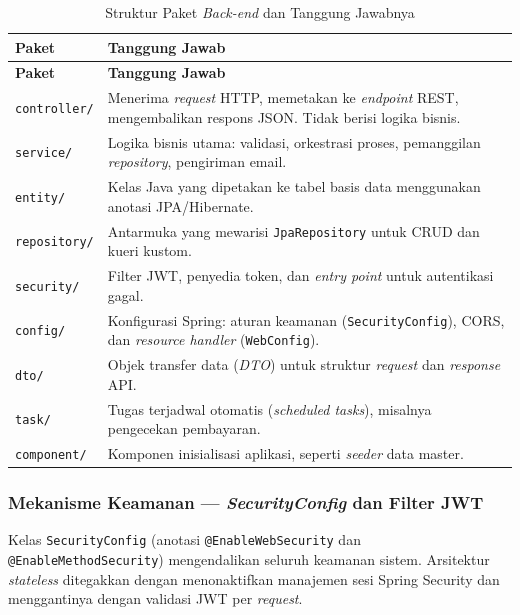 \begin{longtable}{|p{}|p{}|}
	\caption{Struktur Paket \textit{Back-end} dan Tanggung Jawabnya}
	\label{table:4.struktur_paket}\\
	\hline
	\textbf{Paket} & \textbf{Tanggung Jawab} \\
	\hline
	\endfirsthead
	\hline
	\textbf{Paket} & \textbf{Tanggung Jawab} \\
	\hline
	\endhead
	\texttt{controller/} & Menerima \textit{request} HTTP, memetakan ke \textit{endpoint} REST, mengembalikan respons JSON. Tidak berisi logika bisnis. \\
	\hline
	\texttt{service/} & Logika bisnis utama: validasi, orkestrasi proses, pemanggilan \textit{repository}, pengiriman email. \\
	\hline
	\texttt{entity/} & Kelas Java yang dipetakan ke tabel basis data menggunakan anotasi JPA/Hibernate. \\
	\hline
	\texttt{repository/} & Antarmuka yang mewarisi \texttt{JpaRepository} untuk CRUD dan kueri kustom. \\
	\hline
	\texttt{security/} & Filter JWT, penyedia token, dan \textit{entry point} untuk autentikasi gagal. \\
	\hline
	\texttt{config/} & Konfigurasi Spring: aturan keamanan (\texttt{SecurityConfig}), CORS, dan \textit{resource handler} (\texttt{WebConfig}). \\
	\hline
	\texttt{dto/} & Objek transfer data (\textit{DTO}) untuk struktur \textit{request} dan \textit{response} API. \\
	\hline
	\texttt{task/} & Tugas terjadwal otomatis (\textit{scheduled tasks}), misalnya pengecekan pembayaran. \\
	\hline
	\texttt{component/} & Komponen inisialisasi aplikasi, seperti \textit{seeder} data master. \\
	\hline
\end{longtable}

\subsubsection{Mekanisme Keamanan --- \textit{SecurityConfig} dan Filter JWT}

Kelas \texttt{SecurityConfig} (anotasi \texttt{@EnableWebSecurity} dan \texttt{@EnableMethodSecurity}) mengendalikan seluruh keamanan sistem. Arsitektur \textit{stateless} ditegakkan dengan menonaktifkan manajemen sesi Spring Security dan menggantinya dengan validasi JWT per \textit{request}.\par

